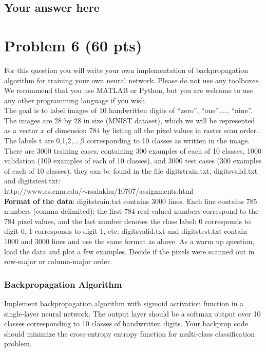 \documentclass{article}
\begin{document}
\subsection*{Your answer here}

\section*{Problem 6 (60 pts)}

For this question you will 
write your own implementation of backpropagation algorithm for 
training your own neural network.
Please do not use any toolboxes. 
We recommend that you use MATLAB or Python, but you are welcome
to use any other programming language if you wish. 
\\
 
The goal is to label images of
10 handwritten digits of ``zero'', ``one'',..., ``nine''.
The images are 28 by 28 in size (MNIST dataset), which we will be represented
as a vector $x$ of dimension 784 by listing all the pixel values in
raster scan order. The labels t are 0,1,2,...,9 corresponding to
10 classes as written in the image.
There are 3000 training cases, containing 300 examples of each of 10 
classes, 
1000 validation (100 examples of each of 10 classes), and 3000 
test cases (300 examples of each of 10 classes). 
they can be found in the file digitstrain.txt, digitsvalid.txt
 and digitstest.txt: \\
http://www.cs.cmu.edu/$\sim$rsalakhu/10707/assignments.html
\\

{\bf Format of the data}: digitstrain.txt contains 3000 lines.
Each line contains 785 numbers (comma delimited): 
the first 784 real-valued numbers
correspond to the
784 pixel values, and the last number denotes
the class label: 0 corresponds to digit 0, 1 corresponds to digit 1, etc. 
digitsvalid.txt and digitstest.txt contain 1000 and 3000 lines 
and use the same format as above.
As a warm up question, load the data and plot a few examples. Decide if the pixels were scanned out in row-major or column-major order.



\subsubsection*{Backpropagation Algorithm}
Implement backpropagation algorithm with sigmoid activation function 
in a single-layer neural network. The output layer should be 
a softmax output over 10 classes
corresponding to 10 classes of handwritten digits. 
Your backprop code should minimize the cross-entropy entropy function 
for multi-class classification problem.
 
\end{document}
